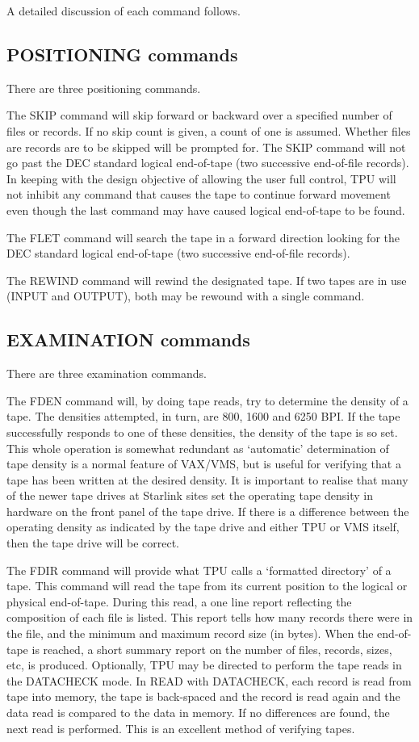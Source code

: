 A detailed discussion of each command follows.

\subsection{POSITIONING commands}

There are three positioning commands.

The SKIP command will skip forward or backward over a specified number of files
or records.
If no skip count is given, a count of one is assumed.
Whether files are records are to be skipped will be prompted for.
The SKIP command will not go past the DEC standard logical end-of-tape (two
successive end-of-file records).
In keeping with the design objective of allowing the user full control, TPU will
not inhibit any command that causes the tape to continue forward movement even
though the last command may have caused logical end-of-tape to be found.

The FLET command will search the tape in a forward direction looking for the DEC
standard logical end-of-tape (two successive end-of-file records).

The REWIND command will rewind the designated tape.
If two tapes are in use (INPUT and OUTPUT), both may be rewound with a single
command.

\subsection{EXAMINATION commands}

There are three examination commands.

The FDEN command will, by doing tape reads, try to determine the density of a
tape.
The densities attempted, in turn, are 800, 1600 and 6250 BPI.
If the tape successfully responds to one of these densities, the density of the
tape is so set.
This whole operation is somewhat redundant as `automatic' determination of tape
density is a normal feature of VAX/VMS, but is useful for verifying that a tape
has been written at the desired density.
It is important to realise that many of the newer tape drives at
Starlink sites set the operating tape density in hardware on the
front panel of the tape drive. If there is a difference between the
operating density as indicated by the tape drive and either
TPU or VMS itself, then the tape drive will be correct.

The FDIR command will provide what TPU calls a `formatted directory' of a tape.
This command will read the tape from its current position to the logical or
physical end-of-tape.
During this read, a one line report reflecting the composition of each file is
listed.
This report tells how many records there were in the file, and the minimum and
maximum record size (in bytes).
When the end-of-tape is reached, a short summary report on the number of files,
records, sizes, etc, is produced.
Optionally, TPU may be directed to perform the tape reads in the DATACHECK mode.
In READ with DATACHECK, each record is read from tape into memory, the tape is
back-spaced and the record is read again and the data read is compared to the
data in memory.
If no differences are found, the next read is performed.
This is an excellent method of verifying tapes.


